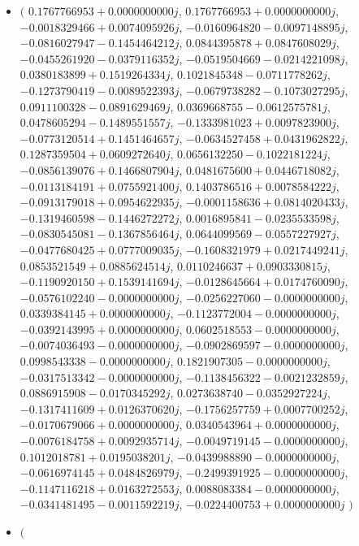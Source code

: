 \documentclass[14pt,a4paper]{article}
\begin{document}
\begin{itemize}
\item
$\big($
$0.1767766953+0.0000000000j$, $0.1767766953+0.0000000000j$, $-0.0018329466+0.0074095926j$, $-0.0160964820-0.0097148895j$, $-0.0816027947-0.1454464212j$, $0.0844395878+0.0847608029j$, $-0.0455261920-0.0379116352j$, $-0.0519504669-0.0214221098j$, $0.0380183899+0.1519264334j$, $0.1021845348-0.0711778262j$, $-0.1273790419-0.0089522393j$, $-0.0679738282-0.1073027295j$, $0.0911100328-0.0891629469j$, $0.0369668755-0.0612575781j$, $0.0478605294-0.1489551557j$, $-0.1333981023+0.0097823900j$, $-0.0773120514+0.1451464657j$, $-0.0634527458+0.0431962822j$, $0.1287359504+0.0609272640j$, $0.0656132250-0.1022181224j$, $-0.0856139076+0.1466807904j$, $0.0481675600+0.0446718082j$, $-0.0113184191+0.0755921400j$, $0.1403786516+0.0078584222j$, $-0.0913179018+0.0954622935j$, $-0.0001158636+0.0814020433j$, $-0.1319460598-0.1446272272j$, $0.0016895841-0.0235533598j$, $-0.0830545081-0.1367856464j$, $0.0644099569-0.0557227927j$, $-0.0477680425+0.0777009035j$, $-0.1608321979+0.0217449241j$, $0.0853521549+0.0885624514j$, $0.0110246637+0.0903330815j$, $-0.1190920150+0.1539141694j$, $-0.0128645664+0.0174760090j$, $-0.0576102240-0.0000000000j$, $-0.0256227060-0.0000000000j$, $0.0339384145+0.0000000000j$, $-0.1123772004-0.0000000000j$, $-0.0392143995+0.0000000000j$, $0.0602518553-0.0000000000j$, $-0.0074036493-0.0000000000j$, $-0.0902869597-0.0000000000j$, $0.0998543338-0.0000000000j$, $0.1821907305-0.0000000000j$, $-0.0317513342-0.0000000000j$, $-0.1138456322-0.0021232859j$, $0.0886915908-0.0170345292j$, $0.0273638740-0.0352927224j$, $-0.1317411609+0.0126370620j$, $-0.1756257759+0.0007700252j$, $-0.0170679066+0.0000000000j$, $0.0340543964+0.0000000000j$, $-0.0076184758+0.0092935714j$, $-0.0049719145-0.0000000000j$, $0.1012018781+0.0195038201j$, $-0.0439988890-0.0000000000j$, $-0.0616974145+0.0484826979j$, $-0.2499391925-0.0000000000j$, $-0.1147116218+0.0163272553j$, $0.0088083384-0.0000000000j$, $-0.0341481495-0.0011592219j$, $-0.0224400753+0.0000000000j$
$\big)$
\item
$\big($

\end{itemize}
\end{document}
